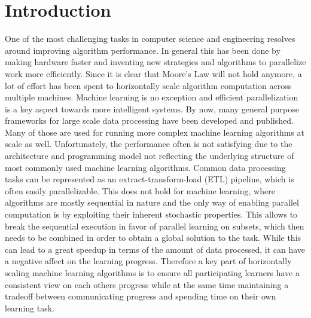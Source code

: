
\chapter{Introduction}
One of the most challenging tasks in computer science and engineering resolves around improving algorithm performance.
In general this has been done by making hardware faster and inventing new strategies and algorithms to parallelize work more efficiently.
Since it is clear that Moore's Law will not hold anymore, a lot of effort has been spent to horizontally scale algorithm computation across multiple machines.
Machine learning is no exception and efficient parallelization is a key aspect towards more intelligent systems.
By now, many general purpose frameworks for large scale data processing have been developed and published. Many of those are used for running more complex machine learning algorithms at scale as well.
Unfortunately, the performance often is not satisfying due to the architecture and programming model not reflecting the underlying structure of most commonly used machine learning algorithms.
Common data processing tasks can be represented as an extract-transform-load (ETL) pipeline, which is often easily parallelizable. This does not hold for machine learning, where algorithms are mostly sequential in nature and the only way of enabling parallel computation is by exploiting their inherent stochastic properties. This allows to break the sequential execution in favor of parallel learning on subsets, which then needs to be combined in order to obtain a global solution to the task.
While this can lead to a great speedup in terms of the amount of data processed, it can have a negative affect on the learning progress.
Therefore a key part of horizontally scaling machine learning algorithms is to ensure all participating learners have a consistent view on each others progress while at the same time maintaining a tradeoff between communicating progress and spending time on their own learning task.


